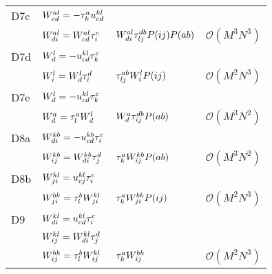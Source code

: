 \begin{center}
\begin{longtable}{@{}llll@{}}
                D7c
                & $W^{al}_{cd} = - \tau^{a}_{k} u^{kl}_{cd}$ \\
                & $W^{al}_{di} = W^{al}_{cd} \tau^{c}_{i}$
                & $W^{al}_{di} \tau^{db}_{lj} P(ij) P(ab)$
                & $\mathcal{O}(M^3 N^3)$ \\

                D7d
                & $W^{l}_{d} = -u^{kl}_{cd} \tau^{c}_{k}$ \\
                & $W^{l}_{i} = W^{l}_{d} \tau^{d}_{i}$
                & $\tau^{ab}_{lj} W^{l}_{i} P(ij)$
                & $\mathcal{O}(M^2 N^3)$ \\

                D7e
                & $W^{l}_{d} = -u^{kl}_{cd} \tau^{c}_{k}$ \\
                & $W^{a}_{d} = \tau^{a}_{l} W^{l}_{d}$
                & $W^{a}_{d} \tau^{db}_{ij} P(ab)$
                & $\mathcal{O}(M^3 N^2)$ \\

                D8a
                & $W^{kb}_{di} = -u^{kb}_{cd} \tau^{c}_{i}$ \\
                & $W^{kb}_{ij} = W^{kb}_{di} \tau^{d}_{j}$
                & $\tau^{a}_{k} W^{kb}_{ij} P(ab)$
                & $\mathcal{O}(M^3 N^2)$
                \\

                D8b
                & $W^{kl}_{ji} = u^{kl}_{cj} \tau^{c}_{i}$ \\
                & $W^{bk}_{ji} = \tau^{b}_{l} W^{kl}_{ji}$
                & $\tau^{a}_{k} W^{bk}_{ji} P(ij)$
                & $\mathcal{O}(M^2 N^3)$
                \\

                D9
                & $W^{kl}_{di} = u^{kl}_{cd} \tau^{c}_{i}$ \\
                & $W^{kl}_{ij} = W^{kl}_{di} \tau^{d}_{j}$ \\
                & $W^{bk}_{ij} = \tau^{b}_{l} W^{kl}_{ij}$
                & $\tau^{a}_{k} W^{bk}_{ij}$
                & $\mathcal{O}(M^2 N^3)$
                \\

            \end{longtable}
        \end{center}

